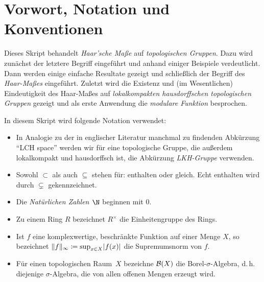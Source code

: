 
\chapter{Vorwort, Notation und Konventionen}
Dieses Skript behandelt \emph{Haar'sche Maße} auf \emph{topologischen Gruppen}.
Dazu wird zunächst der letztere Begriff eingeführt und anhand einiger Beispiele
verdeutlicht. Dann werden einige einfache Resultate gezeigt und schließlich der
Begriff des \emph{Haar-Maßes} eingeführt. Zuletzt wird die Existenz und
(im Wesentlichen) Eindeutigkeit des Haar-Maßes auf \emph{lokalkompakten
hausdorffschen topologischen Gruppen} gezeigt und als erste Anwendung die
\emph{modulare Funktion} besprochen.


\bigskip
In diesem Skript wird folgende Notation verwendet:
\begin{itemize}
    \item
        In Analogie zu der in englischer Literatur manchmal zu findenden
        Abkürzung \enquote{LCH space} werden wir für eine topologische Gruppe,
        die außerdem lokalkompakt und hausdorffsch ist, die Abkürzung
        \emph{LKH-Gruppe} verwenden.
        
    \item
        Sowohl $\subset$ als auch $\subseteq$ stehen für: enthalten oder gleich.
        Echt enthalten wird durch $\subsetneq$ gekennzeichnet.
    
    \item
        Die \emph{Natürlichen Zahlen $\N$} beginnen mit $0$.
    
    \item
        Zu einem Ring $R$ bezeichnet $R^\times$ die Einheitengruppe des Rings.
        
    \item
        Ist $f$ eine komplexwertige, beschränkte Funktion auf einer Menge $X$,
        so bezeichnet $\lVert f\rVert_\infty \coloneqq \sup_{x\in X} \lvert f(x) \rvert$ die
        Supremumsnorm von $f$.
        
    \item
        Für einen topologischen Raum~$X$ bezeichne $\mathcal{B}(X)$ die
        Borel-$\sigma$-Algebra, d.\,h. diejenige $\sigma$-Algebra, die von allen
        offenen Mengen erzeugt wird.
\end{itemize}


